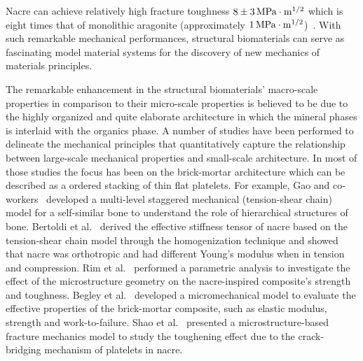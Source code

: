 \documentclass[preprint,12pt,times]{elsarticle}
\numberwithin{equation}{section}
\renewcommand{\>}{$\Rightarrow$}
\begin{document}
Nacre can achieve relatively high fracture toughness $8\pm3 \,\rm{MPa}\cdot m^{1/2}$ which is eight times that of monolithic aragonite (approximately $1\,\rm{MPa}\cdot m^{1/2}$)~\cite{lin2005growth}.
%
With such remarkable mechanical performances, structural biomaterials can serve as fascinating model material systems for the discovery of new mechanics of materials principles.
%


The remarkable enhancement in the structural biomaterials' macro-scale properties in comparison to their micro-scale properties is believed to be due to the highly organized and quite elaborate architecture in which the mineral phases is interlaid with the organics phase.
A number of studies have been performed to delineate the mechanical principles that quantitatively capture the relationship between large-scale mechanical properties and small-scale architecture.
%
In most of those studies the focus has been on the brick-mortar architecture which can be described as a ordered stacking of thin flat platelets.
%
For example, Gao and co-workers~\cite{gao2006application, ji2010mechanical} developed a multi-level staggered mechanical (tension-shear chain) model for a self-similar bone to understand the role of hierarchical structures of bone.
%
Bertoldi et al.~\cite{bertoldi2008nacre} derived the effective stiffness tensor of nacre based on the tension-shear chain model through the homogenization technique and showed that nacre was orthotropic and had different Young's modulus when in tension and compression.
%
Rim et al.~\cite{rim2011dimensional} performed a parametric analysis to investigate the effect of the microstructure geometry on the nacre-inspired composite's strength and toughness.
%
Begley et al.~\cite{begley2012micromechanical} developed a micromechanical model to evaluate the effective properties of the brick-mortar composite, such as elastic modulus, strength and work-to-failure.
%
Shao et al.~\cite{shao2012discontinuous} presented a microstructure-based fracture mechanics model to study the toughening effect due to the crack-bridging mechanism of platelets in nacre.
%
\end{document}
